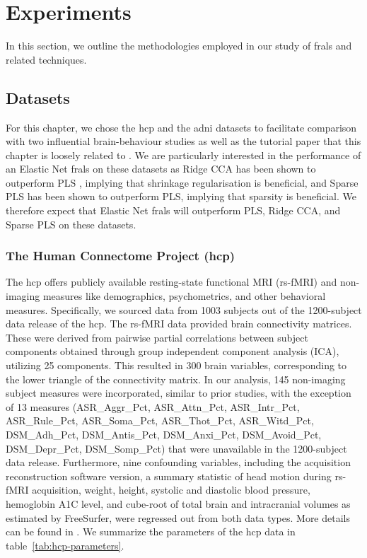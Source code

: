 \section{Experiments}

In this section, we outline the methodologies employed in our study of \acrshort{frals} and related techniques.

\subsection{Datasets}\label{subsec:datasets}

For this chapter, we chose the \acrshort{hcp} and the \acrshort{adni} datasets to facilitate comparison with two influential brain-behaviour studies \citep{smith2015positive, monteiro2016multiple} as well as the tutorial paper that this chapter is loosely related to \citep{mihalik2022canonical}.
We are particularly interested in the performance of an Elastic Net \acrshort{frals}  on these datasets as Ridge CCA has been shown to outperform PLS \citep{mihalik2022canonical}, implying that shrinkage regularisation is beneficial, and Sparse PLS has been shown to outperform PLS\cite{monteiro2016multiple}, implying that sparsity is beneficial.
We therefore expect that Elastic Net \acrshort{frals} will outperform PLS, Ridge CCA, and Sparse PLS on these datasets.

\subsubsection{The Human Connectome Project (\acrshort{hcp})}

The \acrshort{hcp} offers publicly available resting-state functional MRI (rs-fMRI) and non-imaging measures like demographics, psychometrics, and other behavioral measures.
Specifically, we sourced data from 1003 subjects out of the 1200-subject data release of the \acrshort{hcp}.
The rs-fMRI data provided brain connectivity matrices. These were derived from pairwise partial correlations between subject components obtained through group independent component analysis (ICA), utilizing 25 components. This resulted in 300 brain variables, corresponding to the lower triangle of the connectivity matrix. In our analysis, 145 non-imaging subject measures were incorporated, similar to prior studies, with the exception of 13 measures (ASR\_Aggr\_Pct, ASR\_Attn\_Pct, ASR\_Intr\_Pct, ASR\_Rule\_Pct, ASR\_Soma\_Pct, ASR\_Thot\_Pct, ASR\_Witd\_Pct, DSM\_Adh\_Pct, DSM\_Antis\_Pct, DSM\_Anxi\_Pct, DSM\_Avoid\_Pct, DSM\_Depr\_Pct, DSM\_Somp\_Pct) that were unavailable in the 1200-subject data release. Furthermore, nine confounding variables, including the acquisition reconstruction software version, a summary statistic of head motion during rs-fMRI acquisition, weight, height, systolic and diastolic blood pressure, hemoglobin A1C level, and cube-root of total brain and intracranial volumes as estimated by FreeSurfer, were regressed out from both data types.
More details can be found in \citet{smith2015positive, mihalik2022canonical}.
We summarize the parameters of the \acrshort{hcp} data in table~\ref{tab:hcp-parameters}.

